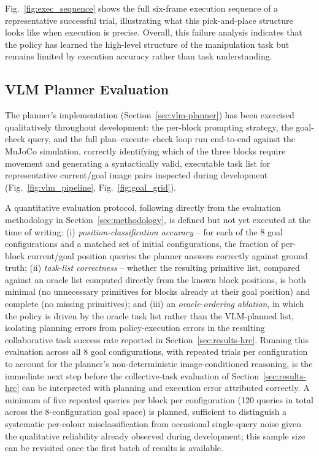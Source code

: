 \documentclass[12pt]{article}
\begin{document}
Fig.~\ref{fig:exec_sequence} shows the full six-frame execution sequence of a representative successful trial, illustrating what this pick-and-place structure looks like when execution is precise. Overall, this failure analysis indicates that the policy has learned the high-level structure of the manipulation task but remains limited by execution accuracy rather than task understanding.

\subsection{VLM Planner Evaluation}
\label{sec:results-vlm}

The planner's implementation (Section~\ref{sec:vlm-planner}) has been exercised qualitatively throughout development: the per-block prompting strategy, the goal-check query, and the full plan--execute--check loop run end-to-end against the MuJoCo simulation, correctly identifying which of the three blocks require movement and generating a syntactically valid, executable task list for representative current/goal image pairs inspected during development (Fig.~\ref{fig:vlm_pipeline}, Fig.~\ref{fig:goal_grid}).

A quantitative evaluation protocol, following directly from the evaluation methodology in Section~\ref{sec:methodology}, is defined but not yet executed at the time of writing: (i) \emph{position-classification accuracy} -- for each of the 8 goal configurations and a matched set of initial configurations, the fraction of per-block current/goal position queries the planner answers correctly against ground truth; (ii) \emph{task-list correctness} -- whether the resulting primitive list, compared against an oracle list computed directly from the known block positions, is both minimal (no unnecessary primitives for blocks already at their goal position) and complete (no missing primitives); and (iii) an \emph{oracle-ordering ablation}, in which the policy is driven by the oracle task list rather than the VLM-planned list, isolating planning errors from policy-execution errors in the resulting collaborative task success rate reported in Section~\ref{sec:results-hrc}. Running this evaluation across all 8 goal configurations, with repeated trials per configuration to account for the planner's non-deterministic image-conditioned reasoning, is the immediate next step before the collective-task evaluation of Section~\ref{sec:results-hrc} can be interpreted with planning and execution error attributed correctly. A minimum of five repeated queries per block per configuration (120 queries in total across the 8-configuration goal space) is planned, sufficient to distinguish a systematic per-colour misclassification from occasional single-query noise given the qualitative reliability already observed during development; this sample size can be revisited once the first batch of results is available.
\end{document}
